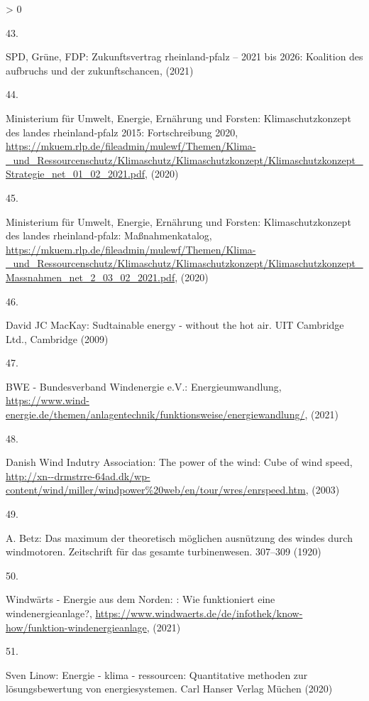 \documentclass[a4paper,11pt]{article}
\newlength{\cslhangindent}
\newlength{\csllabelwidth}
\newenvironment{CSLReferences}[3] %
 {%
  \setlength{\parindent}{0pt}
  \ifodd #1 \everypar{\setlength{\hangindent}{\cslhangindent}}\ignorespaces\fi
  \ifnum #2 > 0
  \setlength{\parskip}{#2\baselineskip}
  \fi
 }%
 {}
\newcommand{\CSLLeftMargin}[1]{\parbox[t]{\maxof{\widthof{#1}}{\csllabelwidth}}{#1}}
\newcommand{\CSLRightInline}[1]{\parbox[t]{\linewidth}{#1}}
\begin{document}
\begin{CSLReferences}{0}{0}
\leavevmode\hypertarget{ref-SPD.2021}{}%
\CSLLeftMargin{43. }
\CSLRightInline{SPD, Grüne, FDP: Zukunftsvertrag rheinland-pfalz -- 2021 bis 2026: Koalition des aufbruchs und der zukunftschancen, (2021)}

\leavevmode\hypertarget{ref-MinisteriumfurUmweltEnergieErnahrungundForsten.2020b}{}%
\CSLLeftMargin{44. }
\CSLRightInline{Ministerium für Umwelt, Energie, Ernährung und Forsten: Klimaschutzkonzept des landes rheinland-pfalz 2015: Fortschreibung 2020, \url{https://mkuem.rlp.de/fileadmin/mulewf/Themen/Klima-_und_Ressourcenschutz/Klimaschutz/Klimaschutzkonzept/Klimaschutzkonzept_Strategie_net_01_02_2021.pdf}, (2020)}

\leavevmode\hypertarget{ref-MinisteriumfurUmweltEnergieErnahrungundForsten.2020}{}%
\CSLLeftMargin{45. }
\CSLRightInline{Ministerium für Umwelt, Energie, Ernährung und Forsten: Klimaschutzkonzept des landes rheinland-pfalz: Ma{ß}nahmenkatalog, \url{https://mkuem.rlp.de/fileadmin/mulewf/Themen/Klima-_und_Ressourcenschutz/Klimaschutz/Klimaschutzkonzept/Klimaschutzkonzept_Massnahmen_net_2_03_02_2021.pdf}, (2020)}

\leavevmode\hypertarget{ref-DavidJCMacKay.2009}{}%
\CSLLeftMargin{46. }
\CSLRightInline{David JC MacKay: Sudtainable energy - without the hot air. {UIT Cambridge Ltd.}, Cambridge (2009)}

\leavevmode\hypertarget{ref-BWE.2021}{}%
\CSLLeftMargin{47. }
\CSLRightInline{BWE - Bundesverband Windenergie e.V.: Energieumwandlung, \url{https://www.wind-energie.de/themen/anlagentechnik/funktionsweise/energiewandlung/}, (2021)}

\leavevmode\hypertarget{ref-DanishWindIndutryAssociation.2003}{}%
\CSLLeftMargin{48. }
\CSLRightInline{Danish Wind Indutry Association: The power of the wind: Cube of wind speed, \url{http://xn--drmstrre-64ad.dk/wp-content/wind/miller/windpower\%20web/en/tour/wres/enrspeed.htm}, (2003)}

\leavevmode\hypertarget{ref-A.Betz.1920}{}%
\CSLLeftMargin{49. }
\CSLRightInline{A. Betz: Das maximum der theoretisch m{ö}glichen ausn{ü}tzung des windes durch windmotoren. Zeitschrift f{ü}r das gesamte turbinenwesen. 307--309 (1920)}

\leavevmode\hypertarget{ref-WindwartsEnergieausdemNorden.2021}{}%
\CSLLeftMargin{50. }
\CSLRightInline{Windwärts - Energie aus dem Norden: : Wie funktioniert eine windenergieanlage?, \url{https://www.windwaerts.de/de/infothek/know-how/funktion-windenergieanlage}, (2021)}

\leavevmode\hypertarget{ref-SvenLinow.2020}{}%
\CSLLeftMargin{51. }
\CSLRightInline{Sven Linow: Energie - klima - ressourcen: Quantitative methoden zur l{ö}sungsbewertung von energiesystemen. {Carl Hanser Verlag M{ü}chen} (2020)}


\end{CSLReferences}
\end{document}

